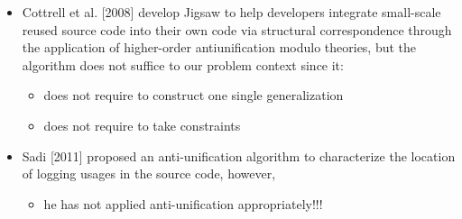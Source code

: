 \documentclass{article}
\begin{document}
\begin{itemize} [leftmargin=.1in]
\begin{itemize}
\item Cottrell et al. [2008] develop Jigsaw to help developers integrate small-scale reused source code into their own code via structural correspondence through the application of higher-order antiunification modulo theories, but the algorithm does not suffice to our problem context since it:
\begin{itemize}
\item does not require to construct one single generalization
\item does not require to take constraints
\end{itemize}
\item Sadi [2011] proposed an anti-unification algorithm to characterize the location of logging usages in the source code, however,
\begin{itemize}
\item he has not applied anti-unification appropriately!!! 
\end{itemize}

\end{itemize}


\end{itemize}
\end{document}
